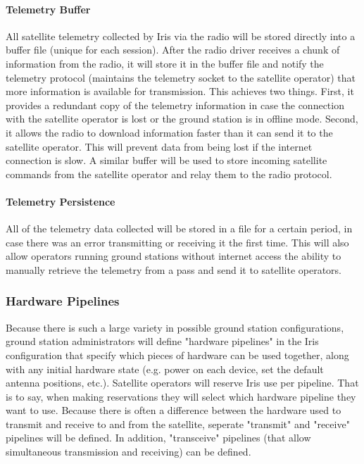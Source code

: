 \documentclass{mxl-note}
\begin{document}
\paragraph{Telemetry Buffer} All satellite telemetry collected by Iris via the radio will be stored directly into a buffer file (unique for each session). After the radio driver receives a chunk of information from the radio, it will store it in the buffer file and notify the telemetry protocol (maintains the telemetry socket to the satellite operator) that more information is available for transmission. This achieves two things. First, it provides a redundant copy of the telemetry information in case the connection with the satellite operator is lost or the ground station is in offline mode. Second, it allows the radio to download information faster than it can send it to the satellite operator. This will prevent data from being lost if the internet connection is slow. A similar buffer will be used to store incoming satellite commands from the satellite operator and relay them to the radio protocol.

\paragraph{Telemetry Persistence}
All of the telemetry data collected will be stored in a file for a certain period, in case there was an error transmitting or receiving it the first time. This will also allow operators running ground stations without internet access the ability to manually retrieve the telemetry from a pass and send it to satellite operators.

\subsubsection{Hardware Pipelines}
Because there is such a large variety in possible ground station configurations, ground station administrators will define "hardware pipelines" in the Iris configuration that specify which pieces of hardware can be used together, along with any initial hardware state (e.g. power on each device, set the default antenna positions, etc.). Satellite operators will reserve Iris use per pipeline. That is to say, when making reservations they will select which hardware pipeline they want to use. Because there is often a difference between the hardware used to transmit and receive to and from the satellite, seperate "transmit" and "receive" pipelines will be defined. In addition, "transceive" pipelines (that allow simultaneous transmission and receiving) can be defined. 
\end{document}
